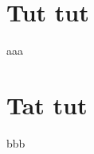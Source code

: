 \documentclass{article}
\begin{document}
\section{Tut tut}

aaa





\section{Tat tut}

bbb
\end{document}
